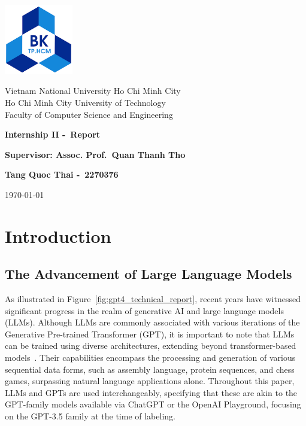 \documentclass[12pt]{extarticle}
\author{}
\newcommand{\schoolname}{Vietnam National University Ho Chi Minh City \\ Ho Chi Minh City University of Technology \\ Faculty of Computer Science and Engineering}
\newcommand{\schoollogo}{\includegraphics[width=3cm]{img/hcmut.png}}
\begin{document}
\begin{titlepage}
    \centering
    \vspace*{2cm}
    \schoollogo\par
    \vspace{1cm}
    {\Large \schoolname\par}
    \vspace{3cm}
    {\huge\bfseries Internship II -\ Report \par}
    \vspace{1cm}
    {\Large\bfseries Supervisor: Assoc. Prof.\ Quan Thanh Tho \par}
    \vspace{1cm}
    {\large \bfseries Tang Quoc Thai -\ 2270376\par}
    \vfill
    {\large \today\par}
\end{titlepage}

\tableofcontents
\newpage

\section{Introduction}

\subsection{The Advancement of Large Language Models}
As illustrated in Figure~\ref{fig:gpt4_technical_report}, recent years have witnessed significant progress in the realm of generative AI and large language models (LLMs). Although LLMs are commonly associated with various iterations of the Generative Pre-trained Transformer (GPT), it is important to note that LLMs can be trained using diverse architectures, extending beyond transformer-based models~\cite{devlin2019bert}. Their capabilities encompass the processing and generation of various sequential data forms, such as assembly language, protein sequences, and chess games, surpassing natural language applications alone. Throughout this paper, LLMs and GPTs are used interchangeably, specifying that these are akin to the GPT-family models available via ChatGPT or the OpenAI Playground, focusing on the GPT-3.5 family at the time of labeling.
\end{document}
